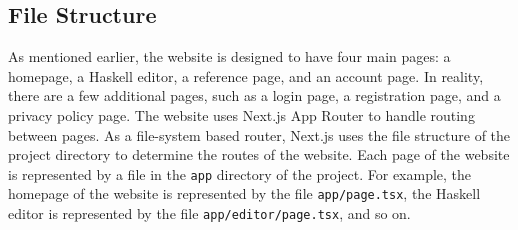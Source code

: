 \documentclass[../main.tex]{subfiles}
\begin{document}
        \subsection{File Structure}
            As mentioned earlier, the website is designed to have four main pages: a
                homepage, a Haskell editor, a reference page, and an account page.
            In reality, there are a few additional pages, such as a login page, a
                registration page, and a privacy policy page.
            The website uses Next.js App Router to handle routing between pages.
            As a file-system based router, Next.js uses the file structure of the project
                directory to determine the routes of the website.
            Each page of the website is represented by a file in the \texttt{app} directory
                of the project.
            For example, the homepage of the website is represented by the file
                \texttt{app/page.tsx}, the Haskell editor is represented by the file
                \texttt{app/editor/page.tsx}, and so on.
\end{document}
